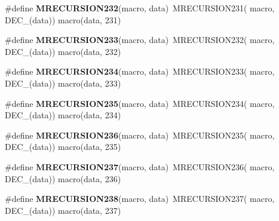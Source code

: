 \begin{DoxyCompactItemize}
\item 
\hypertarget{group__group__sam0__utils__mrecursion_ga6eaa22abc9c118aceaec7716bcaf7158}{}\#define {\bfseries M\+R\+E\+C\+U\+R\+S\+I\+O\+N232}(macro,  data)~M\+R\+E\+C\+U\+R\+S\+I\+O\+N231(  macro, D\+E\+C\+\_\+(data))   macro(data, 231)\label{group__group__sam0__utils__mrecursion_ga6eaa22abc9c118aceaec7716bcaf7158}

\item 
\hypertarget{group__group__sam0__utils__mrecursion_ga81fce57cdf82d227ab4610a36a8614e4}{}\#define {\bfseries M\+R\+E\+C\+U\+R\+S\+I\+O\+N233}(macro,  data)~M\+R\+E\+C\+U\+R\+S\+I\+O\+N232(  macro, D\+E\+C\+\_\+(data))   macro(data, 232)\label{group__group__sam0__utils__mrecursion_ga81fce57cdf82d227ab4610a36a8614e4}

\item 
\hypertarget{group__group__sam0__utils__mrecursion_ga6e4d96e8ad67be74b062f79374f9e08f}{}\#define {\bfseries M\+R\+E\+C\+U\+R\+S\+I\+O\+N234}(macro,  data)~M\+R\+E\+C\+U\+R\+S\+I\+O\+N233(  macro, D\+E\+C\+\_\+(data))   macro(data, 233)\label{group__group__sam0__utils__mrecursion_ga6e4d96e8ad67be74b062f79374f9e08f}

\item 
\hypertarget{group__group__sam0__utils__mrecursion_gaa7d5430690e1370d6f49a1e6378b6afb}{}\#define {\bfseries M\+R\+E\+C\+U\+R\+S\+I\+O\+N235}(macro,  data)~M\+R\+E\+C\+U\+R\+S\+I\+O\+N234(  macro, D\+E\+C\+\_\+(data))   macro(data, 234)\label{group__group__sam0__utils__mrecursion_gaa7d5430690e1370d6f49a1e6378b6afb}

\item 
\hypertarget{group__group__sam0__utils__mrecursion_gac42f885ee78a99d9b0ea05eee47744f7}{}\#define {\bfseries M\+R\+E\+C\+U\+R\+S\+I\+O\+N236}(macro,  data)~M\+R\+E\+C\+U\+R\+S\+I\+O\+N235(  macro, D\+E\+C\+\_\+(data))   macro(data, 235)\label{group__group__sam0__utils__mrecursion_gac42f885ee78a99d9b0ea05eee47744f7}

\item 
\hypertarget{group__group__sam0__utils__mrecursion_gab9258aa3f5d03304ea107256779c5f8d}{}\#define {\bfseries M\+R\+E\+C\+U\+R\+S\+I\+O\+N237}(macro,  data)~M\+R\+E\+C\+U\+R\+S\+I\+O\+N236(  macro, D\+E\+C\+\_\+(data))   macro(data, 236)\label{group__group__sam0__utils__mrecursion_gab9258aa3f5d03304ea107256779c5f8d}

\item 
\hypertarget{group__group__sam0__utils__mrecursion_gaded5f696adc611ccbf8aa9a4b8841a24}{}\#define {\bfseries M\+R\+E\+C\+U\+R\+S\+I\+O\+N238}(macro,  data)~M\+R\+E\+C\+U\+R\+S\+I\+O\+N237(  macro, D\+E\+C\+\_\+(data))   macro(data, 237)\label{group__group__sam0__utils__mrecursion_gaded5f696adc611ccbf8aa9a4b8841a24}


\end{DoxyCompactItemize}
